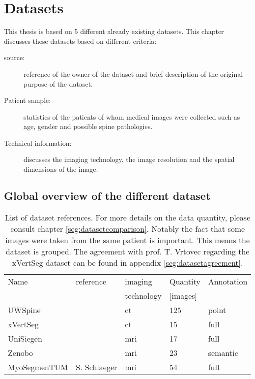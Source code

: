 \chapter{Datasets}

This thesis is based on 5 different already existing datasets.
This chapter discusses these datasets based on different criteria:

\begin{description}
    \item[source:] reference of the owner of the dataset and brief description of the original purpose of the dataset.
    \item[Patient sample:] statistics of the patients of whom medical images were collected such as age, gender and possible spine pathologies.
    \item[Technical information:] discusses the imaging technology, the image resolution and the spatial dimensions of the image. 
\end{description}

\section{Global overview of the different dataset}

\begin{SCtable}[\sidecaptionrelwidth][h]
 
    \begin{tabular}{ l l l l l} 
     \hline
     \hline
     Name & reference & imaging & Quantity & Annotation \\
          &           & technology & [images] & \\
     \hline 
    UWSpine & \cite{Glocker}  & \acrshort{ct} & 125 & point  \\ 
    xVertSeg & \cite{Yoa2015} & \acrshort{ct} & 15 & full \\
    UniSiegen  &  & \acrshort{mri} & 17 & full \\
    Zenobo & & \acrshort{mri} & 23 & semantic \\
    MyoSegmenTUM & S. Schlaeger & \acrshort{mri} &  54 & full \\
     \hline
     \hline
    \end{tabular}
    \caption{List of dataset references. For more details on the data quantity, please consult chapter \ref{seg:datasetcomparison}. 
    Notably the fact that some images were taken from the same patient is important. This means the dataset is grouped. 
    The agreement with prof. T. Vrtovec regarding the xVertSeg dataset can be found in appendix \ref{seg:datasetagreement}.}

\end{SCtable}

